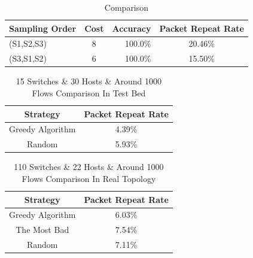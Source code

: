 \documentclass[conference,compsoc]{IEEEtran}
\begin{document}
\begin{table}[]
\centering
\caption{Comparison}
\begin{tabular}{|l|c|r|c|} 

\hline 
Sampling Order&Cost&Accuracy&Packet Repeat Rate\\
\hline  
(S1,S2,S3)&8&100.0\%&20.46\%\\
\hline 
(S3,S1,S2)&6&100.0\%&15.50\%\\
\hline 
\end{tabular}
\end{table}

\begin{table}[]
\centering
\caption{15 Switches \& 30 Hosts \& Around 1000 Flows Comparison In Test Bed }
\begin{tabular}{|c|c|} 

\hline 
Strategy&Packet Repeat Rate\\
\hline  
Greedy Algorithm & 4.39\%\\
\hline
Random & 5.93\%\\

\hline 
\end{tabular}
\end{table}


\begin{table}[]
\centering
\caption{110 Switches \& 22 Hosts \& Around 1000 Flows Comparison In Real Topology }
\begin{tabular}{|c|c|} 

\hline 
Strategy&Packet Repeat Rate\\
\hline  
Greedy Algorithm & 6.03\%\\
\hline
The Most Bad & 7.54\%\\
\hline 
Random & 7.11\%\\
\hline 
\end{tabular}
\end{table}












\end{document}
